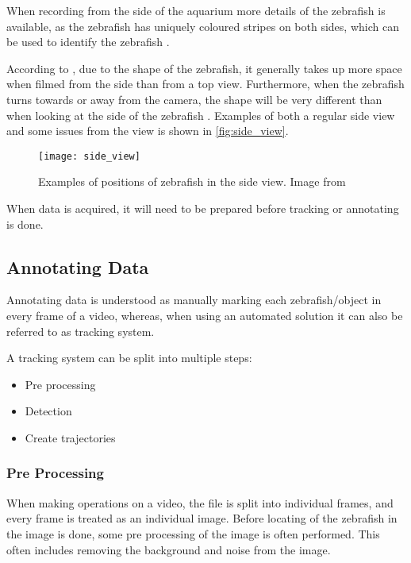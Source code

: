 When recording from the side of the aquarium more details of the zebrafish is available, as the zebrafish has uniquely coloured stripes on both sides, which can be used to identify the zebrafish \citep{Karpova2018}.

According to \cite{Qian2017}, due to the shape of the zebrafish, it generally takes up more space when filmed from the side than from a top view. Furthermore, when the zebrafish turns towards or away from the camera, the shape will be very different than when looking at the side of the zebrafish \citep{Pedersen2017}. Examples of both a regular side view and some issues from the view is shown in \autoref{fig:side_view}.

\begin{figure}[H]
	\centering
	\texttt{[image: side\_view]}
	\caption{Examples of positions of zebrafish in the side view. Image from \cite{Pedersen2017}}
	\label{fig:side_view}
\end{figure}

When data is acquired, it will need to be prepared before tracking or annotating is done. 

\subsection{Annotating Data}

Annotating data is understood as manually marking each zebrafish/object in every frame of a video, whereas, when using an automated solution it can also be referred to as tracking system. 

A tracking system can be split into multiple steps:

\begin{itemize}
	\item Pre processing
	\item Detection
	\item Create trajectories
\end{itemize}

\subsubsection{Pre Processing}
When making operations on a video, the file is split into individual frames, and every frame is treated as an individual image. Before locating of the zebrafish in the image is done, some pre processing of the image is often performed. This often includes removing the background and noise from the image.

